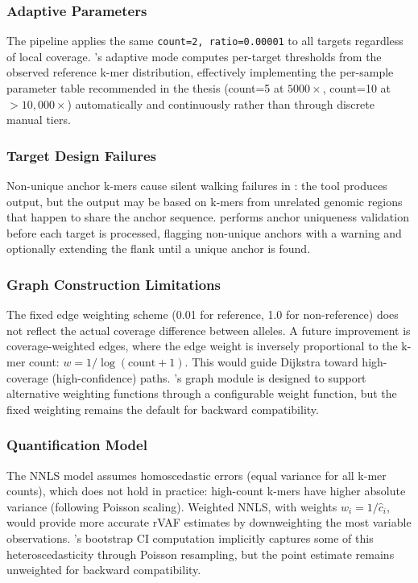 \subsubsection{Adaptive Parameters}

The \km{} pipeline applies the same \texttt{count=2, ratio=0.00001} to all
targets regardless of local coverage.  \kmerdet{}'s adaptive mode computes
per-target thresholds from the observed reference k-mer distribution, effectively
implementing the per-sample parameter table recommended in the thesis (count=5
at $5000\times$, count=10 at $>10,000\times$) automatically and continuously
rather than through discrete manual tiers.

\subsubsection{Target Design Failures}

Non-unique anchor k-mers cause silent walking failures in \km{}: the tool
produces output, but the output may be based on k-mers from unrelated genomic
regions that happen to share the anchor sequence.  \kmerdet{} performs anchor
uniqueness validation before each target is processed, flagging non-unique
anchors with a warning and optionally extending the flank until a unique anchor
is found.

\subsubsection{Graph Construction Limitations}

The fixed edge weighting scheme (0.01 for reference, 1.0 for non-reference) does
not reflect the actual coverage difference between alleles.  A future improvement
is coverage-weighted edges, where the edge weight is inversely proportional to
the k-mer count: $w = 1 / \log(\text{count} + 1)$.  This would guide Dijkstra
toward high-coverage (high-confidence) paths.  \kmerdet{}'s graph module is
designed to support alternative weighting functions through a configurable
weight function, but the fixed weighting remains the default for backward
compatibility.

\subsubsection{Quantification Model}

The NNLS model assumes homoscedastic errors (equal variance for all k-mer counts),
which does not hold in practice: high-count k-mers have higher absolute variance
(following Poisson scaling).  Weighted NNLS, with weights $w_i = 1/\hat{c}_i$,
would provide more accurate rVAF estimates by downweighting the most variable
observations.  \kmerdet{}'s bootstrap CI computation implicitly captures some
of this heteroscedasticity through Poisson resampling, but the point estimate
remains unweighted for backward compatibility.

